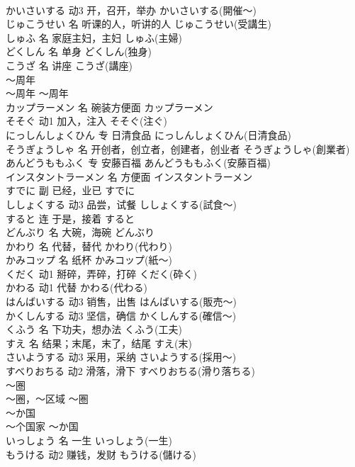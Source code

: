 \documentclass[8pt]{extreport}
\begin{document}
\begin{CJK}{UTF8}{min}
\\	かいさいする	动3	开，召开，举办	かいさいする(開催～)	
\\	じゅこうせい	名	听课的人，听讲的人	じゅこうせい(受講生)	
\\	しゅふ	名	家庭主妇，主妇	しゅふ(主婦)	
\\	どくしん	名	单身	どくしん(独身)	
\\	こうざ	名	讲座	こうざ(講座)	
\\	～周年	
\\	～周年	～周年	
\\	カップラーメン	名	碗装方便面	カップラーメン	
\\	そそぐ	动1	加入，注入	そそぐ(注ぐ)	
\\	にっしんしょくひん	专	日清食品	にっしんしょくひん(日清食品)	
\\	そうぎょうしゃ	名	开创者，创立者，创建者，创业者	そうぎょうしゃ(創業者)	
\\	あんどうももふく	专	安藤百福	あんどうももふく(安藤百福)	
\\	インスタントラーメン	名	方便面	インスタントラーメン	
\\	すでに	副	已经，业已	すでに	
\\	ししょくする	动3	品尝，试餐	ししょくする(試食～)	
\\	すると	连	于是，接着	すると	
\\	どんぶり	名	大碗，海碗	どんぶり	
\\	かわり	名	代替，替代	かわり(代わり)	
\\	かみコップ	名	纸杯	かみコップ(紙～)	
\\	くだく	动1	掰碎，弄碎，打碎	くだく(砕く)	
\\	かわる	动1	代替	かわる(代わる)	
\\	はんばいする	动3	销售，出售	はんばいする(販売～)	
\\	かくしんする	动3	坚信，确信	かくしんする(確信～)	
\\	くふう	名	下功夫，想办法	くふう(工夫)	
\\	すえ	名	结果；末尾，末了，结尾	すえ(末)	
\\	さいようする	动3	采用，采纳	さいようする(採用～)	
\\	すべりおちる	动2	滑落，滑下	すべりおちる(滑り落ちる)	
\\	～圏	
\\	～圈，～区域	～圏	
\\	～か国	
\\	～个国家	～か国	
\\	いっしょう	名	一生	いっしょう(一生)	
\\	もうける	动2	赚钱，发财	もうける(儲ける)	

\end{CJK}
\end{document}
